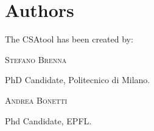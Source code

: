 \label{authors}

\section{Authors}
The CSAtool has been created by:

\vspace{3 mm}

\noindent \textsc{Stefano Brenna}

\noindent PhD Candidate, Politecnico di Milano.

\vspace{3 mm}

\noindent \textsc{Andrea Bonetti}

\noindent Phd Candidate, EPFL.